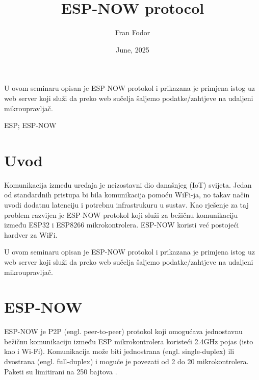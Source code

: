 \documentclass[seminarskirad]{fer}
\title{ESP-NOW protocol}
\author{Fran Fodor}
\date{June, 2025}
\begin{document}
\maketitle


\mainmatter



\begin{sazetak}
  U ovom seminaru opisan je ESP-NOW protokol i prikazana je primjena istog uz web server koji služi da preko web sučelja šaljemo podatke/zahtjeve na udaljeni mikroupravljač.
\end{sazetak}

\begin{kljucnerijeci}
  ESP; ESP-NOW
\end{kljucnerijeci}


\tableofcontents


\chapter{Uvod}
\label{pog:uvod}

Komunikacija između uređaja je neizostavni dio današnjeg (IoT) svijeta. Jedan od standardnih pristupa bi bila komunikacija pomoću WiFi-ja, no takav način uvodi dodatnu latenciju i potrebnu infrastrukuru u sustav. Kao rješenje za taj problem razvijen je ESP-NOW protokol koji služi za bežičnu komunikaciju između ESP32 i ESP8266 mikrokontrolera. ESP-NOW koristi već postojeći hardver za WiFi.

U ovom seminaru opisan je ESP-NOW protokol i prikazana je primjena istog uz web server koji služi da preko web sučelja šaljemo podatke/zahtjeve na udaljeni mikroupravljač.

\chapter{ESP-NOW}
\label{pog:uvod_u_espnow}

ESP-NOW je P2P (engl. peer-to-peer) protokol koji omogućava jednostavnu bežičnu komunikaciju između ESP mikrokontrolera koristeći 2.4GHz pojas (isto kao i Wi-Fi). Komunikacija može biti jednostrana (engl. single-duplex) ili dvostrana (engl. full-duplex) i moguće je povezati od 2 do 20 mikrokontrolera. Paketi su limitirani na 250 bajtova \cite{b1}.
\end{document}
